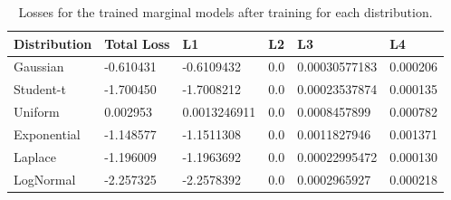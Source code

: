 \begin{table}[h]
    \centering
    \caption{Losses for the trained marginal models after training for each distribution.}
    \begin{tabular}{llllll}
        Distribution & Total Loss & L1 & L2 & L3 & L4 \\
        \midrule
        Gaussian & -0.610431 & -0.6109432 & 0.0 & 0.00030577183 & 0.000206 \\
        Student-t & -1.700450 & -1.7008212 & 0.0 & 0.00023537874 & 0.000135 \\
        Uniform & 0.002953 & 0.0013246911 & 0.0 & 0.0008457899 & 0.000782 \\
        Exponential & -1.148577 & -1.1511308 & 0.0 & 0.0011827946 & 0.001371 \\
        Laplace & -1.196009 & -1.1963692 & 0.0 & 0.00022995472 & 0.000130 \\
        LogNormal & -2.257325 & -2.2578392 & 0.0 & 0.0002965927 & 0.000218 \\
    \end{tabular}
    \label{tab:MarginalFinalLosses}
\end{table}


